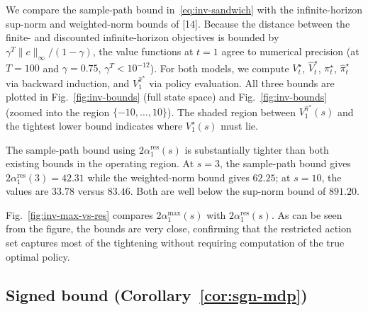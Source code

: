 \documentclass[10pt]{article}
\theoremstyle{definition}
\begin{document}
We compare the sample-path bound in~\eqref{eq:inv-sandwich} with the
infinite-horizon sup-norm and weighted-norm bounds of [14]. Because the
distance between the finite- and discounted infinite-horizon objectives
is bounded by $\gamma^T \|c\|_\infty/(1-\gamma)$, the value functions at
$t = 1$ agree to numerical precision (at $T = 100$ and $\gamma = 0.75$,
$\gamma^T < 10^{-12}$). For both models, we compute $V^\star_t$,
$\hat V^\star_t$, $\pi^\star_t$, $\hat\pi^\star_t$ via backward
induction, and $V^{\hat\pi^\star}_1$ via policy evaluation. All three
bounds are plotted in Fig.~\ref{fig:inv-bounds}
(full state space) and Fig.~\ref{fig:inv-bounds}
(zoomed into the region $\{-10, \dots, 10\}$). The shaded region
between $V^{\hat\pi^\star}_1(s)$ and the tightest lower bound indicates
where $V^\star_1(s)$ must lie.

The sample-path bound using $2\alpha^{\mathrm{res}}_1(s)$ is
substantially tighter than both existing bounds in the operating
region. At $s = 3$, the sample-path bound gives
$2\alpha^{\mathrm{res}}_1(3) = 42.31$ while the weighted-norm bound
gives $62.25$; at $s = 10$, the values are $33.78$ versus $83.46$.
Both are well below the sup-norm bound of $891.20$.

Fig.~\ref{fig:inv-max-vs-res} compares $2\alpha^{\max}_1(s)$ with
$2\alpha^{\mathrm{res}}_1(s)$. As can be seen from the figure, the
bounds are very close, confirming that the restricted action set
captures most of the tightening without requiring computation of the
true optimal policy.

\subsection*{Signed bound (Corollary~\ref{cor:sgn-mdp})}
\end{document}
